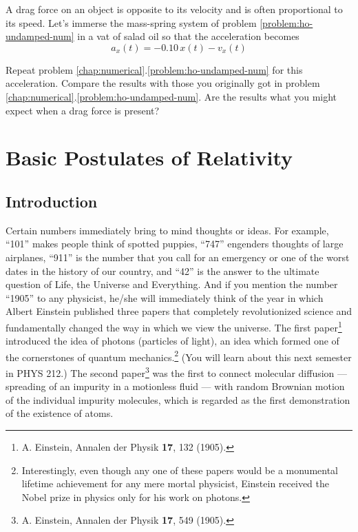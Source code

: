 \begin{exercise}
  A drag force on an object is opposite to its velocity and is often
  proportional to its speed.  Let's immerse the mass-spring system of
  problem \eqref{problem:ho-undamped-num} in a vat of salad oil so
  that the acceleration becomes
  \[a_x(t) = -0.10\, x(t) - v_x(t)\] 

  Repeat problem \ref{chap:numerical}.\ref{problem:ho-undamped-num}
  for this acceleration.  Compare the results with those you
  originally got in problem
  \ref{chap:numerical}.\ref{problem:ho-undamped-num}.  Are the
  results what you might expect when a drag force is present?
\end{exercise}



\chapter{Basic Postulates of Relativity}
\label{chap:relativityI}


\section{Introduction}

Certain numbers immediately bring to mind thoughts or ideas.  For
example, ``101'' makes people think of spotted puppies, ``747''
engenders thoughts of large airplanes, ``911'' is the number that you
call for an emergency or one of the worst dates in the history of our
country, and ``42'' is the answer to the ultimate question of Life,
the Universe and Everything.  And if you mention the number ``1905''
to any physicist, he/she will immediately think of the year in which
Albert Einstein published three papers that completely revolutionized
science and fundamentally changed the way in which we view the
universe.  The first paper\footnote{A. Einstein, Annalen der Physik
  \textbf{17}, 132 (1905).} introduced the idea of photons (particles of
light), an idea which formed one of the cornerstones of quantum
mechanics.\footnote{Interestingly, even though any one of these papers
  would be a monumental lifetime achievement for any mere mortal
  physicist, Einstein received the Nobel prize in physics only for his
  work on photons.}  (You will learn about this next semester in PHYS
212.)  The second paper\footnote{A. Einstein, Annalen der Physik \textbf{    17}, 549 (1905).}  was the first to connect molecular diffusion
--- spreading of an impurity in a motionless fluid --- with random
Brownian motion of the individual impurity molecules, which is regarded
as the first demonstration of the existence of atoms.
   
